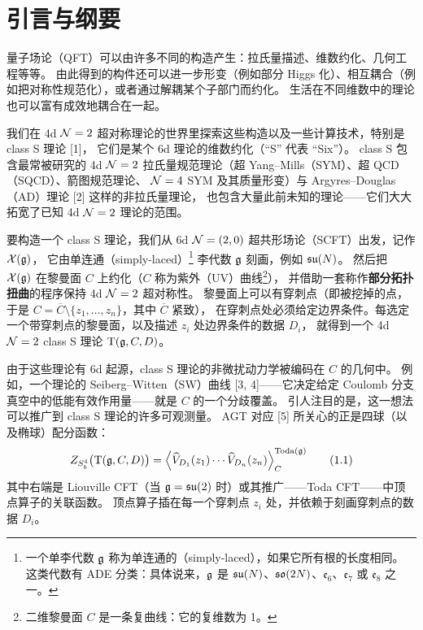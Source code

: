 \section{引言与纲要}

量子场论（QFT）可以由许多不同的构造产生：拉氏量描述、维数约化、几何工程等等。
由此得到的构件还可以进一步形变（例如部分 Higgs 化）、相互耦合（例如把对称性规范化），或者通过解耦某个子部门而约化。
生活在不同维数中的理论也可以富有成效地耦合在一起。

我们在 4d $\mathcal{N}=2$ 超对称理论的世界里探索这些构造以及一些计算技术，特别是 class S 理论 [1]，
它们是某个 6d 理论的维数约化（“S” 代表 “Six”）。
class S 包含最常被研究的 4d $\mathcal{N}=2$ 拉氏量规范理论（超 Yang--Mills（SYM）、超 QCD（SQCD）、箭图规范理论、
$\mathcal{N}=4$ SYM 及其质量形变）与 Argyres--Douglas（AD）理论 [2] 这样的非拉氏量理论，
也包含大量此前未知的理论------它们大大拓宽了已知 4d $\mathcal{N}=2$ 理论的范围。

要构造一个 class S 理论，我们从 6d $\mathcal{N}=(2,0)$ 超共形场论（SCFT）出发，记作 $\mathcal{X}(\mathfrak{g})$，
它由单连通（simply-laced）\footnote{一个单李代数 $\mathfrak{g}$ 称为单连通的（simply-laced），如果它所有根的长度相同。
这类代数有 ADE 分类：具体说来，$\mathfrak{g}$ 是 $\mathfrak{su}(N)$、$\mathfrak{so}(2N)$、$\mathfrak{e}_6$、$\mathfrak{e}_7$ 或 $\mathfrak{e}_8$ 之一。}
李代数 $\mathfrak{g}$ 刻画，例如 $\mathfrak{su}(N)$。
然后把 $\mathcal{X}(\mathfrak{g})$ 在黎曼面 $C$ 上约化（$C$ 称为紫外（UV）曲线\footnote{二维黎曼面 $C$ 是一条复曲线：它的复维数为 1。}），
并借助一套称作\textbf{部分拓扑扭曲}的程序保持 4d $\mathcal{N}=2$ 超对称性。
黎曼面上可以有穿刺点（即被挖掉的点，于是 $C=\overline{C}\setminus\{z_1,\dots,z_n\}$，其中 $\overline{C}$ 紧致），
在穿刺点处必须给定边界条件。每选定一个带穿刺点的黎曼面，以及描述 $z_i$ 处边界条件的数据 $D_i$，
就得到一个 4d $\mathcal{N}=2$ class S 理论 $\mathrm{T}(\mathfrak{g},C,D)$。

由于这些理论有 6d 起源，class S 理论的非微扰动力学被编码在 $C$ 的几何中。
例如，一个理论的 Seiberg--Witten（SW）曲线 [3, 4]------它决定给定 Coulomb 分支真空中的低能有效作用量------就是 $C$ 的一个分歧覆盖。
引人注目的是，这一想法可以推广到 class S 理论的许多可观测量。
AGT 对应 [5] 所关心的正是四球（以及椭球）配分函数：
\begin{equation}
  Z_{S^4_b}\bigl(\mathrm{T}(\mathfrak{g},C,D)\bigr)
  = \Bigl\langle \widehat{V}_{D_1}(z_1)\cdots \widehat{V}_{D_n}(z_n) \Bigr\rangle_{C}^{\mathrm{Toda}(\mathfrak{g})}
  \tag{1.1}
\end{equation}
其中右端是 Liouville CFT（当 $\mathfrak{g}=\mathfrak{su}(2)$ 时）或其推广------Toda CFT------中顶点算子的关联函数。
顶点算子插在每一个穿刺点 $z_i$ 处，并依赖于刻画穿刺点的数据 $D_i$。

